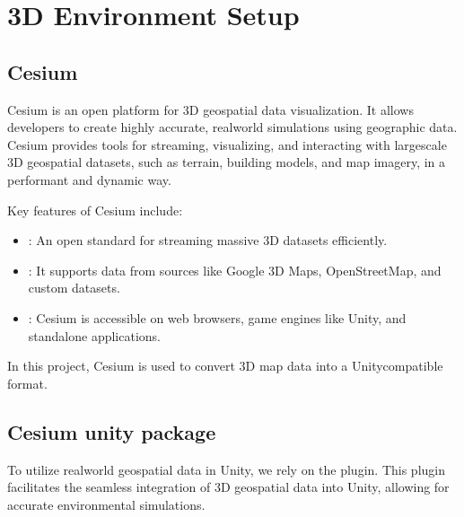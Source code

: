 \documentclass[letterpaper,10pt,english]{jupyterBook}
\begin{document}
\sphinxstepscope


\chapter{3D Environment Setup}
\label{\detokenize{Cesium:d-environment-setup}}\label{\detokenize{Cesium::doc}}

\section{Cesium}
\label{\detokenize{Cesium:cesium}}
\sphinxAtStartPar
Cesium is an open platform for 3D geospatial data visualization. It allows developers to create highly accurate, real\sphinxhyphen{}world simulations using geographic data. Cesium provides tools for streaming, visualizing, and interacting with large\sphinxhyphen{}scale 3D geospatial datasets, such as terrain, building models, and map imagery, in a performant and dynamic way.

\sphinxAtStartPar
Key features of Cesium include:
\begin{itemize}
\item {} 
\sphinxAtStartPar
{}: An open standard for streaming massive 3D datasets efficiently.

\item {} 
\sphinxAtStartPar
{}: It supports data from sources like Google 3D Maps, OpenStreetMap, and custom datasets.

\item {} 
\sphinxAtStartPar
{}: Cesium is accessible on web browsers, game engines like Unity, and standalone applications.

\end{itemize}

\sphinxAtStartPar
In this project, Cesium is used to convert 3D map data into a Unity\sphinxhyphen{}compatible format.


\section{Cesium unity package}
\label{\detokenize{Cesium:cesium-unity-package}}
\sphinxAtStartPar
To utilize real\sphinxhyphen{}world geospatial data in Unity, we rely on the  plugin. This plugin facilitates the seamless integration of 3D geospatial data into Unity, allowing for accurate environmental simulations.
\end{document}
